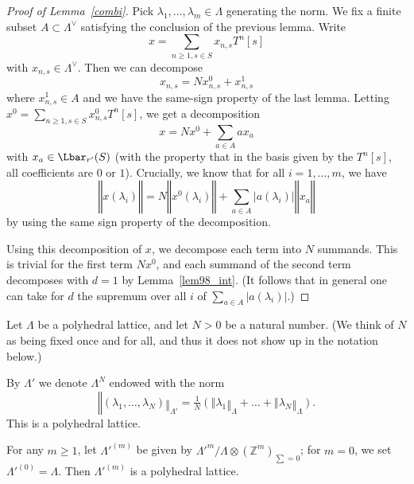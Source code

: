 \begin{proof}[{Proof of Lemma~\ref{combi}}]
  \leanok
  Pick $\lambda_1,\ldots,\lambda_m\in \Lambda$ generating the norm. We fix a finite subset $A\subset \Lambda^\vee$ satisfying the conclusion of the previous lemma. Write
  \[
  x=\sum_{n\geq 1, s\in S} x_{n,s} T^n [s]
  \]
  with $x_{n,s}\in \Lambda^\vee$. Then we can decompose
  \[
  x_{n,s} = N x_{n,s}^0 + x_{n,s}^1
  \]
  where $x_{n,s}^1\in A$ and we have the same-sign property of the last lemma. Letting $x^0 = \sum_{n\geq 1, s\in S} x_{n,s}^0 T^n [s]$, we get a decomposition
  \[
  x = Nx^0 + \sum_{a\in A} a x_a
  \]
  with $x_a\in \Lbar_{r'}(S)$ (with the property that in the
  basis given by the $T^n [s]$, all coefficients are $0$ or $1$). Crucially,
  we know that for all $i=1,\ldots,m$, we have
  \[
  ‖x(\lambda_i)‖ = N ‖x^0(\lambda_i)‖ + \sum_{a\in A} |a(\lambda_i)| ‖x_a‖
  \]
  by using the same sign property of the decomposition.

  Using this decomposition of $x$, we decompose each term into $N$ summands.
  This is trivial for the first term $Nx^0$,
  and each summand of the second term decomposes with $d = 1$ by Lemma~\ref{lem98_int}.
  (It follows that in general one can take for $d$
  the supremum over all $i$ of $\sum_{a\in A} |a(\lambda_i)|$.)
\end{proof}

\begin{definition}
  \label{rescaled-sum}
  \leanok
  Let $\Lambda$ be a polyhedral lattice, and let $N > 0$ be a natural number.
  (We think of $N$ as being fixed once and for all,
  and thus it does not show up in the notation below.)

  By $\Lambda'$ we denote $\Lambda^N$ endowed with the norm
  \[
	  ‖(\lambda_1,\ldots,\lambda_N)‖_{\Lambda'} = \tfrac 1N(‖\lambda_1‖_\Lambda+\ldots+‖\lambda_N‖_\Lambda).
  \]
  This is a polyhedral lattice.
\end{definition}

\begin{lemma}
  \label{polyhedral-quotient}
  \leanok
  For any $m\geq 1$, let $\Lambda'^{(m)}$ be given by $\Lambda'^m / \Lambda\otimes (\mathbb Z^m)_{\sum=0}$;
  for $m=0$, we set $\Lambda'^{(0)} = \Lambda$.
  Then $\Lambda'^{(m)}$ is a polyhedral lattice.
\end{lemma}

